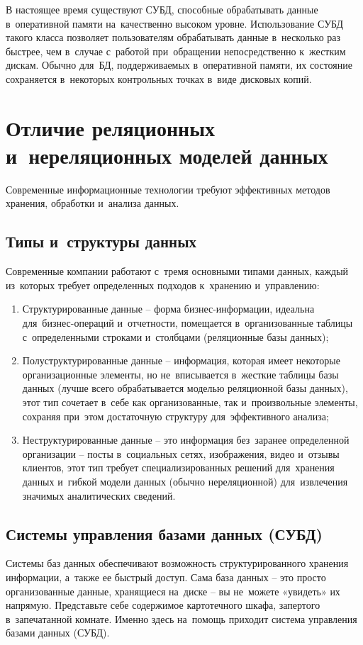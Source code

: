 \documentclass{ou}
\begin{document}
В настоящее время существуют СУБД, способные обрабатывать данные в~оперативной памяти на~качественно высоком уровне. Использование СУБД такого класса позволяет пользователям обрабатывать данные в~несколько раз быстрее, чем в~случае с~работой при~обращении непосредственно к~жестким дискам. Обычно для~БД, поддерживаемых в~оперативной памяти, их состояние сохраняется в~некоторых контрольных точках в~виде дисковых копий.
\newpage
\section{Отличие реляционных и~нереляционных моделей данных}
Современные информационные технологии требуют эффективных методов хранения, обработки и~анализа данных.
\subsection{Типы и~структуры данных}
Современные компании работают с~тремя основными типами данных, каждый из~которых требует определенных подходов к~хранению и~управлению:
\begin{enumerate}[leftmargin=0em, itemindent=3.75em, nosep, label=\arabic*)]
\item Структурированные данные -- форма бизнес-информации, идеальна для~бизнес-операций и~отчетности, помещается в~организованные таблицы с~определенными строками и~столбцами (реляционные базы данных);
\item Полуструктурированные данные -- информация, которая имеет некоторые организационные элементы, но не~вписывается в~жесткие таблицы базы данных (лучше всего обрабатывается моделью реляционной базы данных), этот тип сочетает в~себе как организованные, так и~произвольные элементы, сохраняя при~этом достаточную структуру для~эффективного анализа;
\item Неструктурированные данные -- это информация без~заранее определенной организации -- посты в~социальных сетях, изображения, видео и~отзывы клиентов, этот тип требует специализированных решений для~хранения данных и~гибкой модели данных (обычно нереляционной) для~извлечения значимых аналитических сведений.
\end{enumerate}
\subsection{Системы управления базами данных (СУБД)}
Системы баз данных обеспечивают возможность структурированного хранения информации, а~также ее быстрый доступ. Сама база данных -- это просто организованные данные, хранящиеся на~диске -- вы не~можете «увидеть» их напрямую. Представьте себе содержимое картотечного шкафа, запертого в~запечатанной комнате. Именно здесь на~помощь приходит система управления базами данных (СУБД).
\end{document}

